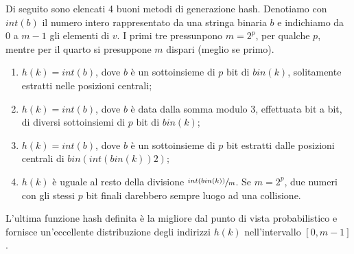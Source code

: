 \documentclass[12pt]{report}
\begin{document}
	Di seguito sono elencati 4 buoni metodi di generazione hash. Denotiamo con $int(b)$ il numero intero rappresentato da una stringa binaria $b$ e indichiamo da 0 a $ m - 1$ gli elementi di $v$. I primi tre pressunpono $m = 2^p$, per qualche $p$, mentre per il quarto si presuppone $m$ dispari (meglio se primo).
	\begin{enumerate}
		\item $h(k) = int(b)$, dove $b$ è un sottoinsieme di $p$ bit di $bin(k)$, solitamente estratti nelle posizioni centrali;
		\item $h(k) = int(b)$, dove $b$ è data dalla somma modulo 3, effettuata bit a bit, di diversi sottoinsiemi di $p$ bit di $bin(k)$;
		\item $h(k) = int(b)$, dove $b$ è un sottoinsieme di $p$ bit estratti dalle posizioni centrali di $bin(int(bin(k))2)$;
		\item $h(k)$ è uguale al resto della divisione $\sfrac{int(bin(k))}{m}$. Se $m = 2^p$, due numeri con gli stessi $p$ bit finali darebbero sempre luogo ad una collisione.
	\end{enumerate}
	L'ultima funzione hash definita è la migliore dal punto di vista probabilistico e fornisce un'eccellente distribuzione degli indirizzi $h(k)$ nell'intervallo $[0, m-1]$.
\end{document}
